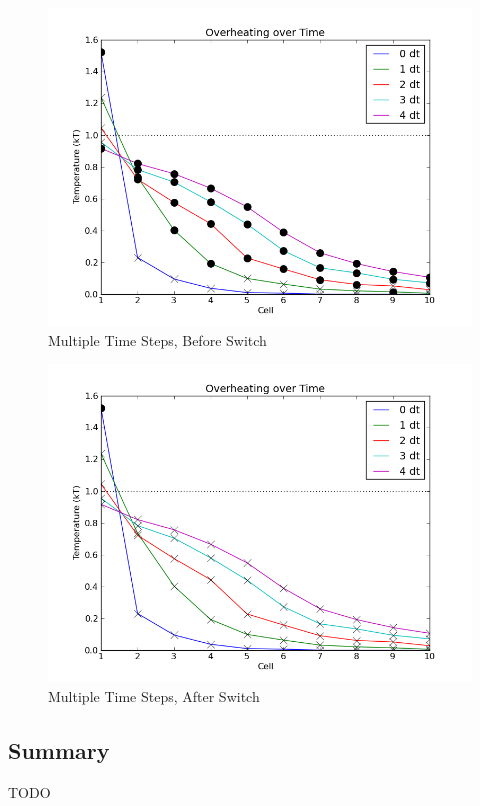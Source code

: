 \begin{figure}[H]
\centering
\includegraphics[width=0.7\linewidth]{./graphics/multistep1}
\caption{Multiple Time Steps, Before Switch}
\label{fig:results_multistep1}
\end{figure}
\begin{figure}[H]
\centering
\includegraphics[width=0.7\linewidth]{./graphics/multistep2}
\caption{Multiple Time Steps, After Switch}
\label{fig:results_multistep2}
\end{figure}
\belowSubSecSkip

\subsection{Summary}
\label{sec:Results-Summary}

\noindent
	\indent TODO










